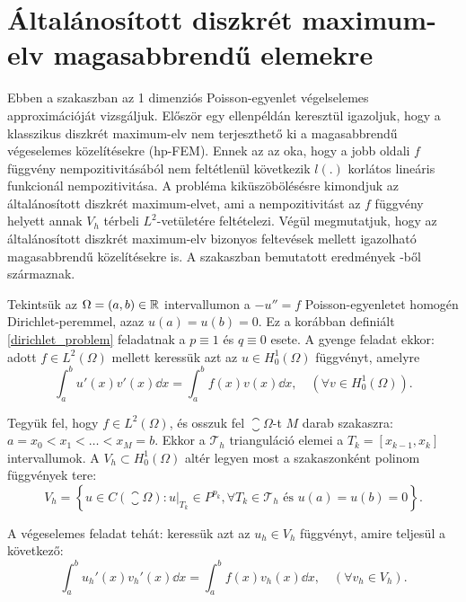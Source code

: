 \section{Általánosított diszkrét maximum-elv magasabbrendű elemekre}\label{sec:general_DMP}

Ebben a szakaszban az 1 dimenziós Poisson-egyenlet végelselemes approximációját vizsgáljuk.  Először egy ellenpéldán keresztül igazoljuk, hogy a klasszikus diszkrét maximum-elv nem terjeszthető ki a magasabbrendű végeselemes közelítésekre (hp-FEM). Ennek az az oka, hogy a jobb oldali $f$ függvény nempozitivitásából nem feltétlenül következik $l(.)$ korlátos lineáris funkcionál nempozitivitása. A probléma kiküszöbölésésre kimondjuk az általánosított diszkrét maximum-elvet, ami a nempozitivitást az $f$ függvény helyett annak $V_h$ térbeli $L^2$-vetületére feltételezi. Végül megmutatjuk, hogy az általánosított diszkrét maximum-elv  bizonyos feltevések mellett igazolható magasabbrendű közelítésekre is. A szakaszban bemutatott eredmények \cite{sol-vej}-ből származnak. 

Tekintsük az $\Omega = (a,b)\in \mathbb{R}$ intervallumon a $-u'' = f$ Poisson-egyenletet homogén Dirichlet-peremmel, azaz $u(a) = u(b) = 0$. Ez a korábban definiált \eqref{dirichlet_problem} feladatnak a $p \equiv 1 $ és $q \equiv 0$ esete. A gyenge feladat ekkor: adott $f \in L^2(\Omega)$ mellett keressük azt az $u \in H_0^1(\Omega)$ függvényt, amelyre
\begin{equation} \label{1dgyenge}
	\int_{a}^{b} u'(x)v'(x) \dd x =  \int_{a}^{b} f(x)v(x) \dd x, \quad (\forall v \in H_0^1(\Omega)).
\end{equation}

Tegyük fel, hogy $f \in L^2(\Omega)$, és osszuk fel  $\closure{\Omega}$-t $M$  darab szakaszra: $a = x_0 < x_1 < \ldots < x_M = b$. Ekkor a $\mathcal{T}_h$ trianguláció elemei a $T_k = [x_{k-1},x_k]$ intervallumok. A $V_h \subset H_0^1(\Omega)$ altér legyen most a
szakaszonként polinom függvények tere:
\begin{equation*}
	V_h = \left\{ u \in C(\closure{\Omega}): u|_{T_k} \in P^{p_k}, \forall T_k \in \mathcal{T}_h  \text{ és } u(a) = u(b) = 0 \right\}.
\end{equation*}

A végeselemes feladat tehát: keressük azt az $u_h \in V_h$ függvényt, amire teljesül a következő:
\begin{equation}\label{diszkret1d}
	\int_{a}^{b} u_h'(x)v_h'(x) \dd x =  \int_{a}^{b} f(x)v_h(x) \dd x, \quad (\forall v_h \in V_h).
\end{equation}

